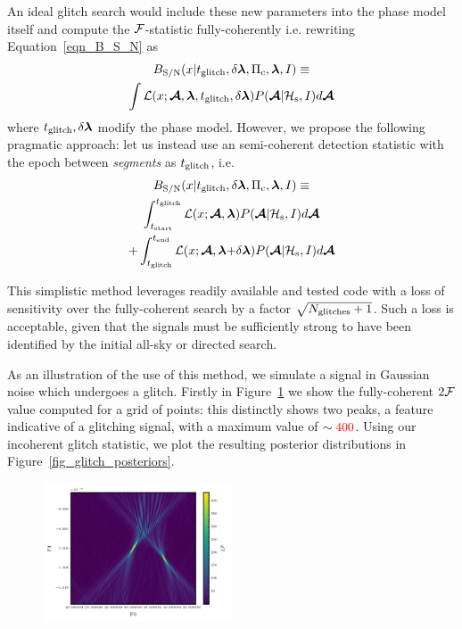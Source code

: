 \documentclass[aps, prd, twocolumn, superscriptaddress, floatfix, showpacs, nofootinbib, longbibliography]{revtex4-1}
\newcommand{\CHECK}[1]{\textcolor{red}{#1}}
\begin{document}
An ideal glitch search would include these new parameters into the phase model
itself and compute the ${\mathcal{F}}$-statistic fully-coherently i.e. rewriting
Equation~\eqref{eqn_B_S_N} as
\begin{multline}
B_{\rm S/N}(x| t_{\rm glitch}, \delta\boldsymbol{\mathbf{\lambda}}, \Pi_{\rm c}, \boldsymbol{\mathbf{\lambda}}, I) \equiv \\
\int
\mathcal{L}(x ;\boldsymbol{\mathcal{A}}, \boldsymbol{\mathbf{\lambda}}, t_{\rm glitch}, \delta\boldsymbol{\mathbf{\lambda}})
P(\boldsymbol{\mathcal{A}}| \mathcal{H}_{\rm s}, I) d\boldsymbol{\mathcal{A}}
\end{multline}
where $t_{\rm glitch}, \delta\boldsymbol{\mathbf{\lambda}}$ modify the phase model. However, we propose the
following pragmatic approach: let us instead use an semi-coherent detection
statistic with the epoch between \emph{segments} as $t_{\rm glitch}$, i.e.
\begin{multline}
B_{\rm S/N}(x| t_{\rm glitch}, \delta\boldsymbol{\mathbf{\lambda}}, \Pi_{\rm c}, \boldsymbol{\mathbf{\lambda}}, I) \equiv \\
\int_{t_{\rm start}}^{t_{\rm glitch}}
\mathcal{L}(x ;\boldsymbol{\mathcal{A}}, \boldsymbol{\mathbf{\lambda}})
P(\boldsymbol{\mathcal{A}}| \mathcal{H}_{\rm s}, I) d\boldsymbol{\mathcal{A}} \\ +
\int_{t_{\rm glitch}}^{t_{\rm end}}
\mathcal{L}(x ;\boldsymbol{\mathcal{A}}, \boldsymbol{\mathbf{\lambda}}{+}\delta\boldsymbol{\mathbf{\lambda}})
P(\boldsymbol{\mathcal{A}}| \mathcal{H}_{\rm s}, I) d\boldsymbol{\mathcal{A}}
\end{multline}

This simplistic method leverages readily available and tested code with a loss
of sensitivity over the fully-coherent search by a factor
$\sqrt{N_{\rm glitches}+1}$. Such a loss is acceptable, given that the signals must
be sufficiently strong to have been identified by the initial all-sky or directed
search.

As an illustration of the use of this method, we simulate a signal in Gaussian
noise which undergoes a glitch. Firstly in Figure~\ref{fig_glitch_grid} we show
the fully-coherent $2{\mathcal{F}}$ value computed for a grid of points: this distinctly
shows two peaks, a feature indicative of a glitching signal, with a maximum
value of $\sim\CHECK{400}$. Using our incoherent glitch statistic, we plot
the resulting posterior distributions in Figure~\ref{fig_glitch_posteriors}.

\begin{figure}[htb]
\centering
\includegraphics[width=0.5\textwidth]{single_glitch_F0F1_grid_2D}
\caption{}
\label{fig_glitch_grid}
\end{figure}
\end{document}
